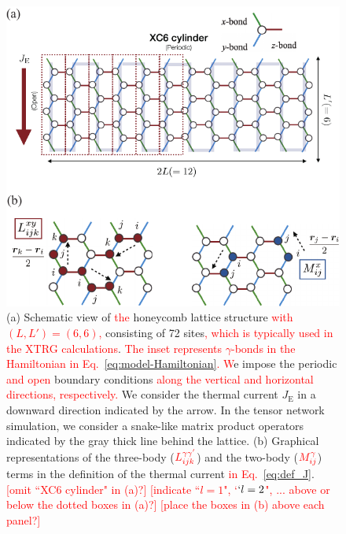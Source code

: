 \documentclass[twocolumn,superscriptaddress,showpacs, longbibliography, aps, prb]{revtex4-2}
\newcommand{\red}[1]{\textcolor{red}{#1}}
\begin{document}
\begin{figure}
  \begin{center}
    \includegraphics[width=\linewidth]{Figs/lattice.pdf}
  \end{center}
  \caption{(a) Schematic view of %
\red{the} honeycomb lattice structure \red{with  $(L, L') = (6, 6) $,} consisting of 72 sites\red{, which is typically used in the XTRG calculations}. 
\red{The inset represents $\gamma$-bonds in the Hamiltonian in Eq.~\eqref{eq:model-Hamiltonian}.} 
\red{W}e impose the periodic \red{and open} boundary conditions \red{along the vertical and horizontal directions, respectively.} %
  We consider the thermal current $J_{\mathrm{E}}$ in a downward direction indicated by the arrow. In the tensor network simulation, we consider a snake-like matrix product operators indicated by the gray thick line behind the lattice. (b) Graphical representations of the three-body ($\red{L_{ijk}^{\gamma\gamma^\prime}}$) and the two-body ($\red{M_{ij}^\gamma}$) terms in the definition of the thermal current \red{in Eq.~}\eqref{eq:def_J}.
\red{[omit ``XC6 cylinder" in (a)?]} 
\red{[indicate ``$l=1$", `$`l=2$", ... above or below the dotted boxes in (a)?]} 
\red{[place the boxes in (b) above each panel?]} 
}
  \label{fig:lattice}
\end{figure}
\end{document}
